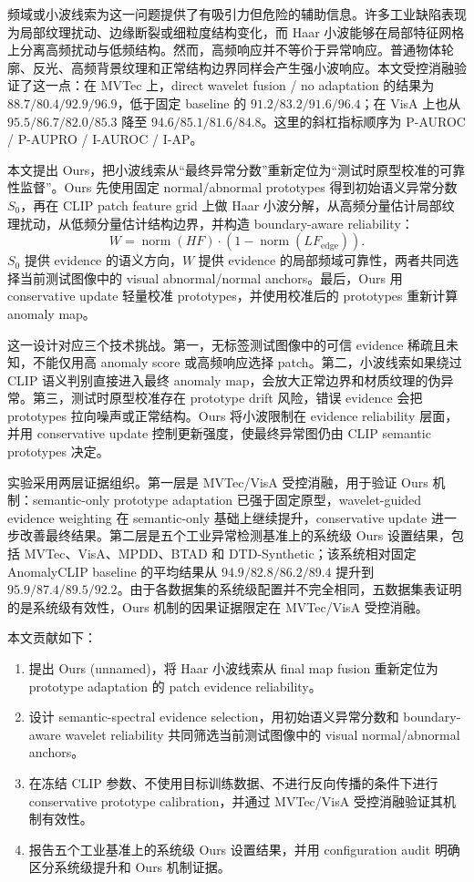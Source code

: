 \documentclass[10pt,a4paper,fontset=none]{ctexart}
\newcommand{\normop}{\operatorname{norm}}
\begin{document}
频域或小波线索为这一问题提供了有吸引力但危险的辅助信息。许多工业缺陷表现为局部纹理扰动、边缘断裂或细粒度结构变化，而 Haar 小波能够在局部特征网格上分离高频扰动与低频结构。然而，高频响应并不等价于异常响应。普通物体轮廓、反光、高频背景纹理和正常结构边界同样会产生强小波响应。本文受控消融验证了这一点：在 MVTec 上，direct wavelet fusion / no adaptation 的结果为 $88.7 / 80.4 / 92.9 / 96.9$，低于固定 baseline 的 $91.2 / 83.2 / 91.6 / 96.4$；在 VisA 上也从 $95.5 / 86.7 / 82.0 / 85.3$ 降至 $94.6 / 85.1 / 81.6 / 84.8$。这里的斜杠指标顺序为 P-AUROC / P-AUPRO / I-AUROC / I-AP。

本文提出 Ours，把小波线索从“最终异常分数”重新定位为“测试时原型校准的可靠性监督”。Ours 先使用固定 normal/abnormal prototypes 得到初始语义异常分数 $S_0$，再在 CLIP patch feature grid 上做 Haar 小波分解，从高频分量估计局部纹理扰动，从低频分量估计结构边界，并构造 boundary-aware reliability：
\begin{equation}
W = \normop(HF) \cdot (1 - \normop(LF_{\mathrm{edge}})).
\end{equation}
$S_0$ 提供 evidence 的语义方向，$W$ 提供 evidence 的局部频域可靠性，两者共同选择当前测试图像中的 visual abnormal/normal anchors。最后，Ours 用 conservative update 轻量校准 prototypes，并使用校准后的 prototypes 重新计算 anomaly map。

这一设计对应三个技术挑战。第一，无标签测试图像中的可信 evidence 稀疏且未知，不能仅用高 anomaly score 或高频响应选择 patch。第二，小波线索如果绕过 CLIP 语义判别直接进入最终 anomaly map，会放大正常边界和材质纹理的伪异常。第三，测试时原型校准存在 prototype drift 风险，错误 evidence 会把 prototypes 拉向噪声或正常结构。Ours 将小波限制在 evidence reliability 层面，并用 conservative update 控制更新强度，使最终异常图仍由 CLIP semantic prototypes 决定。

实验采用两层证据组织。第一层是 MVTec/VisA 受控消融，用于验证 Ours 机制：semantic-only prototype adaptation 已强于固定原型，wavelet-guided evidence weighting 在 semantic-only 基础上继续提升，conservative update 进一步改善最终结果。第二层是五个工业异常检测基准上的系统级 Ours 设置结果，包括 MVTec、VisA、MPDD、BTAD 和 DTD-Synthetic；该系统相对固定 AnomalyCLIP baseline 的平均结果从 $94.9 / 82.8 / 86.2 / 89.4$ 提升到 $95.9 / 87.4 / 89.5 / 92.2$。由于各数据集的系统级配置并不完全相同，五数据集表证明的是系统级有效性，Ours 机制的因果证据限定在 MVTec/VisA 受控消融。

本文贡献如下：
\begin{enumerate}[leftmargin=1.5em]
  \item 提出 Ours (unnamed)，将 Haar 小波线索从 final map fusion 重新定位为 prototype adaptation 的 patch evidence reliability。
  \item 设计 semantic-spectral evidence selection，用初始语义异常分数和 boundary-aware wavelet reliability 共同筛选当前测试图像中的 visual normal/abnormal anchors。
  \item 在冻结 CLIP 参数、不使用目标训练数据、不进行反向传播的条件下进行 conservative prototype calibration，并通过 MVTec/VisA 受控消融验证其机制有效性。
  \item 报告五个工业基准上的系统级 Ours 设置结果，并用 configuration audit 明确区分系统级提升和 Ours 机制证据。
\end{enumerate}
\end{document}
